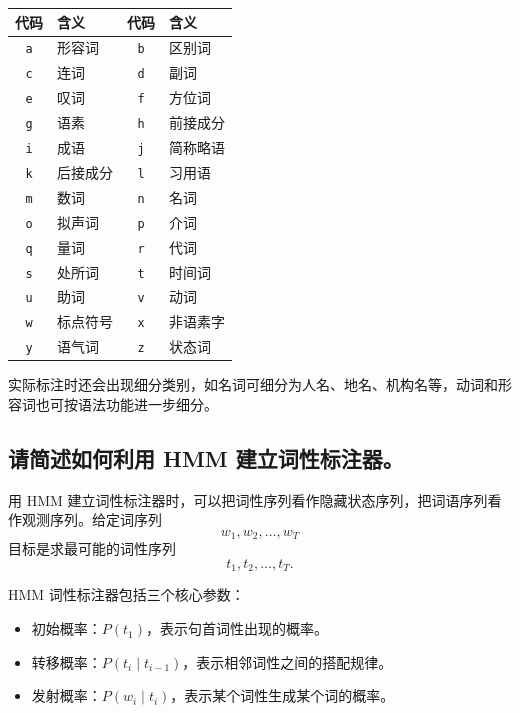 \begin{table}[H]
\centering
\small
\begin{tabular}{|c|l|c|l|}
\hline
代码 & 含义 & 代码 & 含义 \\ \hline
\texttt{a} & 形容词 & \texttt{b} & 区别词 \\ \hline
\texttt{c} & 连词 & \texttt{d} & 副词 \\ \hline
\texttt{e} & 叹词 & \texttt{f} & 方位词 \\ \hline
\texttt{g} & 语素 & \texttt{h} & 前接成分 \\ \hline
\texttt{i} & 成语 & \texttt{j} & 简称略语 \\ \hline
\texttt{k} & 后接成分 & \texttt{l} & 习用语 \\ \hline
\texttt{m} & 数词 & \texttt{n} & 名词 \\ \hline
\texttt{o} & 拟声词 & \texttt{p} & 介词 \\ \hline
\texttt{q} & 量词 & \texttt{r} & 代词 \\ \hline
\texttt{s} & 处所词 & \texttt{t} & 时间词 \\ \hline
\texttt{u} & 助词 & \texttt{v} & 动词 \\ \hline
\texttt{w} & 标点符号 & \texttt{x} & 非语素字 \\ \hline
\texttt{y} & 语气词 & \texttt{z} & 状态词 \\ \hline
\end{tabular}
\end{table}

实际标注时还会出现细分类别，如名词可细分为人名、地名、机构名等，动词和形容词也可按语法功能进一步细分。

\subsection{请简述如何利用 HMM 建立词性标注器。}

用 HMM 建立词性标注器时，可以把词性序列看作隐藏状态序列，把词语序列看作观测序列。给定词序列
\[
  w_1,w_2,\ldots,w_T
\]
目标是求最可能的词性序列
\[
  t_1,t_2,\ldots,t_T.
\]

HMM 词性标注器包括三个核心参数：
\begin{itemize}
  \item 初始概率：$P(t_1)$，表示句首词性出现的概率。
  \item 转移概率：$P(t_i \mid t_{i-1})$，表示相邻词性之间的搭配规律。
  \item 发射概率：$P(w_i \mid t_i)$，表示某个词性生成某个词的概率。
\end{itemize}

